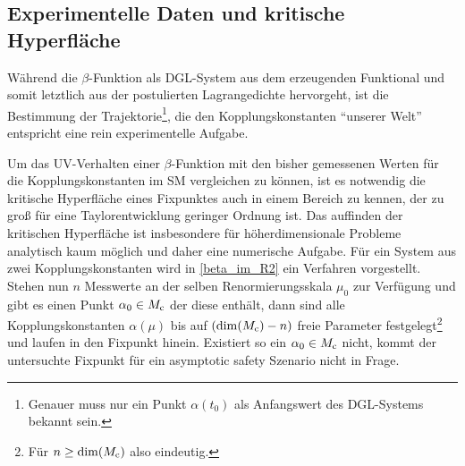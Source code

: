   \subsection{Experimentelle Daten und kritische Hyperfläche}
    Während die $\beta$-Funktion als DGL-System aus dem erzeugenden Funktional 
    und somit letztlich aus der postulierten Lagrangedichte hervorgeht, ist die 
    Bestimmung der Trajektorie\footnote{Genauer muss nur ein Punkt 
    $\alpha(t_0)$ als Anfangswert des DGL-Systems bekannt sein.}, die 
    den Kopplungskonstanten "`unserer Welt"' entspricht eine rein 
    experimentelle Aufgabe. 
  
    Um das UV-Verhalten einer $\beta$-Funktion mit den bisher gemessenen Werten 
    für die Kopplungskonstanten im SM vergleichen zu können, ist es notwendig 
    die kritische Hyperfläche eines Fixpunktes auch in einem Bereich zu kennen, 
    der zu groß für eine Taylorentwicklung geringer Ordnung ist. Das auffinden 
    der kritischen Hyperfläche ist insbesondere für höherdimensionale Probleme 
    analytisch kaum möglich und daher eine numerische Aufgabe. Für ein System 
    aus zwei Kopplungskonstanten wird in \ref{beta_im_R2} ein Verfahren 
    vorgestellt. Stehen nun $n$ Messwerte an der selben Renormierungsskala 
    $\mu_0$ zur Verfügung und gibt es einen Punkt $\alpha_0\in M_\text{c}$ der diese 
    enthält, dann sind alle Kopplungskonstanten $\alpha(\mu)$ bis auf 
    $(\dim (M_\text{c})-n)$ freie Parameter festgelegt\footnote{Für $n\geq \dim(M_\text{c})$ 
    also eindeutig.} und laufen in den Fixpunkt hinein. Existiert so ein 
    $\alpha_0\in M_\text{c}$ nicht, kommt der untersuchte Fixpunkt für ein asymptotic 
    safety Szenario nicht in Frage. 

    

  
    



      


  
  
  
  
